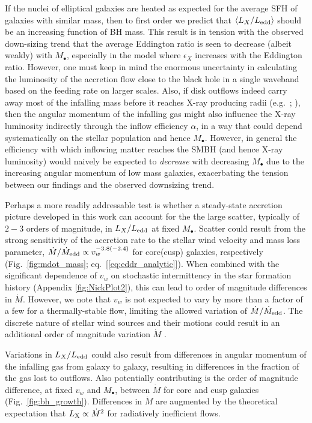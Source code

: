 \documentclass[usenatbib,fleqn]{mn2e}
\begin{document}
If the nuclei of elliptical galaxies are heated as expected for the
average SFH of galaxies with similar mass, then to first order we
predict that $\langle L_{X}/L_{\rm edd}\rangle$ should be an 
increasing function of BH mass.  This result is in tension with the
observed down-sizing trend that the average Eddington ratio is seen to
decrease (albeit weakly) with $M_{\bullet}$, especially in the model where
$\epsilon_X$ increases with the Eddington ratio.
However, one must keep in mind the enormous uncertainty in calculating
the luminosity of the accretion flow close to the black hole in a
single waveband based on the feeding rate on larger scales.  Also, if disk
outflows indeed carry away most of the infalling mass before it reaches X-ray
producing radii (e.g.~\citealt{Blandford&Begelman99};
\citealt{Li+13}), then the angular momentum of the infalling gas might
also influence the X-ray luminosity indirectly through the inflow efficiency $\alpha$, in a way that could depend systematically on the stellar population and hence $M_{\bullet}$.  However, in general the efficiency with which inflowing matter reaches the SMBH (and hence X-ray luminosity) would naively be expected to {\it decrease} with decreasing $M_{\bullet}$ due to the increasing angular momentum of low mass galaxies, exacerbating the tension between our findings and the observed downsizing trend.

Perhaps a more readily addressable test is whether a steady-state
accretion picture developed in this work can account for the the large
scatter, typically of $2-3$ orders of magnitude, in $L_{X}/L_{\rm
  edd}$ at fixed $M_{\bullet}$.  Scatter could result from the strong
sensitivity of the accretion rate to the stellar wind velocity and
mass loss parameter, $\dot{M}/\dot{M}_{\rm edd} \propto
v_{w}^{-3.8(-2.4)}$ for core(cusp) galaxies, respectively
(Fig.~\ref{fig:mdot_mass}; eq.~[\ref{eq:eddr_analytic}]).  When
combined with the significant dependence of $v_w$ on stochastic
intermittency in the star formation history (Appendix
\ref{fig:NickPlot2}), this can lead to order of magnitude differences
in $\dot{M}$. However, we note that $v_w$ is not expected to vary by
more than a factor of a few for a thermally-stable flow, limiting the
allowed variation of $\dot{M}/\dot{M}_{\rm edd}$. The discrete nature
of stellar wind sources and their motions could result in an
additional order of magnitude variation $\dot{M}$ \citep{Cuadra+2008}. 

Variations in $L_{X}/L_{\rm edd}$ could also result from differences
in angular momentum of the infalling gas from galaxy to galaxy,
resulting in differences in the fraction of the gas lost to outflows.
Also potentially contributing is the order of magnitude difference, at
fixed $v_w$ and $M_{\bullet}$, between $\dot{M}$ for core and cusp
galaxies (Fig.~\ref{fig:bh_growth}).  Differences in $\dot{M}$ are
augmented by the theoretical expectation that $L_{\rm X} \propto
\dot{M}^{2} $ for radiatively inefficient flows.
\end{document}
